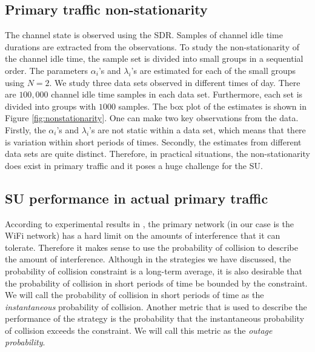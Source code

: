 \documentclass[10pt,final,journal,letterpaper]{IEEEtran}
\begin{document}
\subsection{Primary traffic non-stationarity}
The channel state is observed using the SDR. Samples of channel idle time durations are extracted from the observations. To study the non-stationarity of the channel idle time, the sample set is divided into small groups in a sequential order. The parameters $\alpha_i$'s and $\lambda_i$'s are estimated for each of the small groups using $N=2$. We study three data sets observed in different times of day. There are $100,000$ channel idle time samples in each data set. Furthermore, each set is divided into groups with $1000$ samples. The box plot of the estimates is shown in Figure \ref{fig:nonstationarity}. One can make two key observations from the data. Firstly, the $\alpha_i$'s and $\lambda_i$'s are not static within a data set, which means that there is variation within short periods of times. Secondly, the estimates from different data sets are quite distinct. Therefore, in practical situations, the non-stationarity does exist in primary traffic and it poses a huge challenge for the SU.
\begin{figure*}[!t]
  \centering
  \caption{Box plot of statistics of the parameter estimates in hyper-exponential distribution.}
  \label{fig:nonstationarity}
\end{figure*}

\subsection{SU performance in actual primary traffic}
According to experimental results in \cite{kundargi2010protomac}, the primary network (in our case is the WiFi network) has a hard limit on the amounts of interference that it can tolerate. Therefore it makes sense to use the probability of collision to describe the amount of interference. Although in the strategies we have discussed, the probability of collision constraint is a long-term average, it is also desirable that the probability of collision in short periods of time be bounded by the constraint. We will call the probability of collision in short periods of time as the \emph{instantaneous} probability of collision. Another metric that is used to describe the performance of the strategy is the probability that the instantaneous probability of collision exceeds the constraint. We will call this metric as the \emph{outage probability}.
\end{document}

